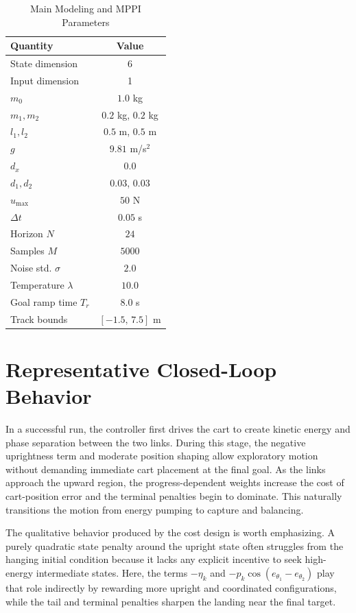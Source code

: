 \documentclass[conference]{IEEEtran}
\begin{document}
\begin{table}[t]
\caption{Main Modeling and MPPI Parameters}
\label{tab:params}
\centering
\begin{tabular}{l c}
\toprule
Quantity & Value \\
\midrule
State dimension & 6 \\
Input dimension & 1 \\
$m_0$ & $1.0$ kg \\
$m_1,m_2$ & $0.2$ kg, $0.2$ kg \\
$l_1,l_2$ & $0.5$ m, $0.5$ m \\
$g$ & $9.81$ m/s$^2$ \\
$d_x$ & $0.0$ \\
$d_1,d_2$ & $0.03$, $0.03$ \\
$u_{\max}$ & $50$ N \\
$\Delta t$ & $0.05$ s \\
Horizon $N$ & $24$ \\
Samples $M$ & $5000$ \\
Noise std. $\sigma$ & $2.0$ \\
Temperature $\lambda$ & $10.0$ \\
Goal ramp time $T_r$ & $8.0$ s \\
Track bounds & $[-1.5,\,7.5]$ m \\
\bottomrule
\end{tabular}
\end{table}

\section{Representative Closed-Loop Behavior}
In a successful run, the controller first drives the cart to create kinetic energy and phase separation between the two links. During this stage, the negative uprightness term and moderate position shaping allow exploratory motion without demanding immediate cart placement at the final goal. As the links approach the upward region, the progress-dependent weights increase the cost of cart-position error and the terminal penalties begin to dominate. This naturally transitions the motion from energy pumping to capture and balancing.

The qualitative behavior produced by the cost design is worth emphasizing. A purely quadratic state penalty around the upright state often struggles from the hanging initial condition because it lacks any explicit incentive to seek high-energy intermediate states. Here, the terms $-\eta_k$ and $-p_k\cos(e_{\theta_1}-e_{\theta_2})$ play that role indirectly by rewarding more upright and coordinated configurations, while the tail and terminal penalties sharpen the landing near the final target.
\end{document}
